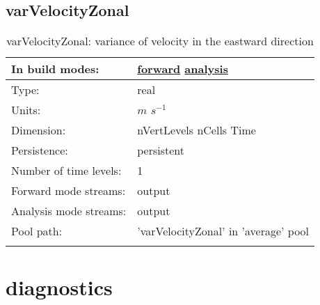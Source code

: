 \subsection[varVelocityZonal]{varVelocityZonal}
\label{subsec:var_sec_average_varVelocityZonal}
\begin{center}
\begin{longtable}{| p{2.0in} | p{4.0in} |}
        \hline 
        In build modes: & \hyperref[subsec:forward_var_tab_average]{forward} \hyperref[subsec:analysis_var_tab_average]{analysis} \\
        \hline 
        Type: & real \\
        \hline 
        Units: & $m$ $s^{-1}$ \\
        \hline 
        Dimension: & nVertLevels nCells Time \\
        \hline 
        Persistence: & persistent \\
        \hline 
        Number of time levels: & 1 \\
        \hline 
		 Forward mode streams: &  output \\
        \hline 
		 Analysis mode streams: &  output \\
        \hline 
            Pool path: & 'varVelocityZonal' in 'average' pool
 \\
		 \hline 
    \caption{varVelocityZonal: variance of velocity in the eastward direction}
\end{longtable}
\end{center}
\section[diagnostics]{diagnostics}
\label{sec:var_sec_diagnostics}
